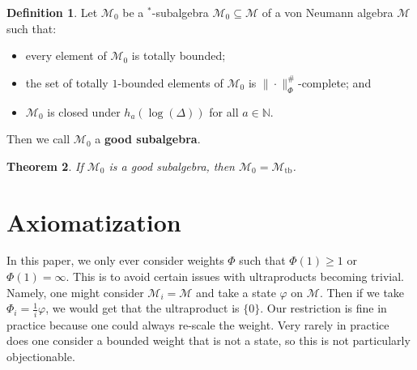 \documentclass[12pt]{amsart}
\newtheorem{thm}{Theorem}[section]
\theoremstyle{definition}
\newtheorem{defn}[thm]{Definition}
\def\vp{\varphi}
\def\cal{\mathcal}
\def \tb{\operatorname{tb}}
\def \bbN{\mathbb{N}}
\begin{document}
\begin{defn}
    Let $\cal M_0$ be a $^*$-subalgebra $\cal M_0 \subseteq \cal M$ of a von Neumann algebra $\cal M$ such that:
    \begin{itemize}
        \item every element of $\cal M_0$ is totally bounded;
        \item the set of totally $1$-bounded elements of $\cal M_0$ is $\|\cdot\|_{\Phi}^\#$-complete; and
        \item $\cal M_0$ is closed under $h_{a}(\log(\Delta))$ for all $a \in \bbN$.
    \end{itemize}
    Then we  call $\cal M_0$ a \textbf{good subalgebra}.
\end{defn}

\begin{thm}\label{KadisonTypeTheorem}
    If $\cal M_0$ is a good subalgebra, then $\cal M_0 = \cal M_{\tb}$.
\end{thm}

\section{Axiomatization}\label{SectionAxiomatization}

In this paper, we only ever consider weights $\Phi$ such that $\Phi(1) \geq 1$ or $\Phi(1) = \infty$.  This is to avoid certain issues with ultraproducts becoming trivial.  Namely, one might consider $\cal M_i = \cal M$ and take a state $\vp$ on $\cal M$.  Then if we take $\Phi_i = \frac{1}{i} \vp$, we would get that the ultraproduct is $\{0\}$.  Our restriction is fine in practice because one could always re-scale the weight.  Very rarely in practice does one consider a bounded weight that is not a state, so this is not particularly objectionable.
\end{document}
